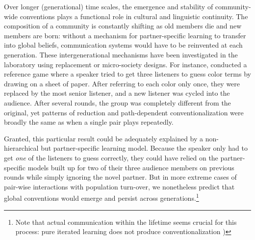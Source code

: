 Over longer (generational) time scales, the emergence and stability of community-wide conventions plays a functional role in cultural and linguistic continuity. The composition of a community is constantly shifting as old members die and new members are born: without a mechanism for partner-specific learning to transfer into global beliefs, communication systems would have to be reinvented at each generation. These intergenerational mechanisms have been investigated in the laboratory using replacement or micro-society designs.%
For instance,  conducted a reference game where a speaker tried to get three listeners to guess color terms by drawing on a sheet of paper. After referring to each color only once, they were replaced by the most senior listener, and a new listener was cycled into the audience. After several rounds, the group was completely different from the original, yet patterns of reduction and path-dependent conventionalization were broadly the same as when a single pair plays repeatedly. 

Granted, this particular result could be adequately explained by a non-hierarchical but partner-specific learning model. Because the speaker only had to get \emph{one} of the listeners to guess correctly, they could have relied on the partner-specific models built up for two of their three audience members on previous rounds while simply ignoring the novel partner. But in more extreme cases of pair-wise interactions with population turn-over, we nonetheless predict that global conventions would emerge and persist across generations.\footnote{
Note that actual communication within the lifetime seems crucial for this process: pure iterated learning does not produce conventionalization \cite{GarrodEtAl10_IteratedLearningGraphicalSymbols})
}


